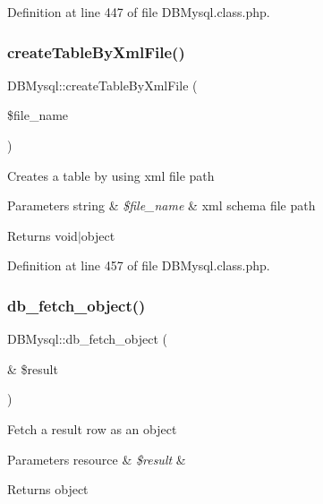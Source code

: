 Definition at line 447 of file D\+B\+Mysql.\+class.\+php.

\hypertarget{classDBMysql_a92f43909e6ba226fc7067ddc25594a33}{}\label{classDBMysql_a92f43909e6ba226fc7067ddc25594a33} 
\subsubsection{\texorpdfstring{create\+Table\+By\+Xml\+File()}{createTableByXmlFile()}}
{\footnotesize\ttfamily D\+B\+Mysql\+::create\+Table\+By\+Xml\+File (\begin{DoxyParamCaption}\item[{}]{\$file\+\_\+name }\end{DoxyParamCaption})}

Creates a table by using xml file path 
\begin{DoxyParams}[1]{Parameters}
string & {\em \$file\+\_\+name} & xml schema file path \\
\hline
\end{DoxyParams}
\begin{DoxyReturn}{Returns}
void$\vert$object 
\end{DoxyReturn}


Definition at line 457 of file D\+B\+Mysql.\+class.\+php.

\hypertarget{classDBMysql_a117189e72a44d1c3b615f133f486cf69}{}\label{classDBMysql_a117189e72a44d1c3b615f133f486cf69} 
\subsubsection{\texorpdfstring{db\+\_\+fetch\+\_\+object()}{db\_fetch\_object()}}
{\footnotesize\ttfamily D\+B\+Mysql\+::db\+\_\+fetch\+\_\+object (\begin{DoxyParamCaption}\item[{\&}]{\$result }\end{DoxyParamCaption})}

Fetch a result row as an object 
\begin{DoxyParams}[1]{Parameters}
resource & {\em \$result} & \\
\hline
\end{DoxyParams}
\begin{DoxyReturn}{Returns}
object 
\end{DoxyReturn}


